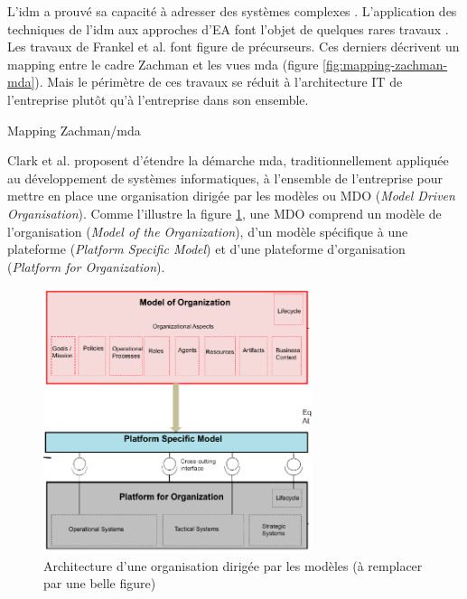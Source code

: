 L'\gls{idm} a prouvé sa capacité à adresser des systèmes complexes \cite{france2007model}. L'application des techniques de l'\gls{idm} aux approches d'EA font l'objet de quelques rares travaux \cite{bruneliere2013support}. Les travaux de Frankel et al. \cite{frankel2003zachman} font figure de précurseurs. Ces derniers décrivent un mapping entre le cadre Zachman et les vues \gls{mda} (figure \ref{fig:mapping-zachman-mda}). Mais le périmètre de ces travaux se réduit à l'architecture IT de l'entreprise plutôt qu'à l'entreprise dans son ensemble.

\begin{table}[!ht]
    \vspace*{0.5em}
    
    \caption{Mapping Zachman/\gls{mda} \protect\cite{frankel2003zachman}}
    \label{fig:mapping-zachman-mda}
\end{table}

Clark et al. \cite{clark_towards_2014} proposent d'étendre la démarche \gls{mda},  traditionnellement appliquée au développement de systèmes informatiques, à l'ensemble de l'entreprise pour mettre en place une organisation dirigée par les modèles ou MDO (\textit{Model Driven Organisation}). Comme l'illustre la figure \ref{fig:mdo}, une MDO comprend un modèle de l'organisation (\textit{Model of the Organization}), d'un modèle spécifique à une plateforme (\textit{Platform Specific Model}) et d'une plateforme d'organisation (\textit{Platform for Organization}). 

\begin{figure}[!htbp]
 \begin{center}
   \includegraphics[width=0.7\textwidth]{figures/images/Chapitre1/mdo.png}
 \end{center}
 \caption{Architecture d'une organisation dirigée par les modèles (à remplacer par une belle figure) \protect\cite{clark_towards_2014}}
 \label{fig:mdo}
\end{figure}

